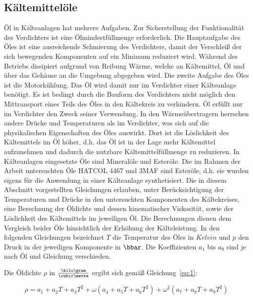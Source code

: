 \subsection{Kältemittelöle}
\label{subsec:Kältemittelöle}

Öl in Kälteanlagen hat mehrere Aufgaben.
Zur Sicherstellung der Funktionalität des Verdichters ist eine Ölmindestfüllmenge erforderlich. Die Hauptaufgabe des Öles ist eine ausreichende Schmierung des Verdichters, damit der Verschleiß der sich bewegenden Komponenten auf ein Minimum reduziert wird.  Während des Betriebs dissipiert aufgrund von Reibung Wärme, welche an Kältemittel, Öl und über das Gehäuse an die Umgebung abgegeben wird. \newline
Die zweite Aufgabe des Öles ist die Motorkühlung. Das Öl wird damit nur im Verdichter einer Kälteanlage benötigt. Es ist bedingt durch die Bauform des Verdichters nicht möglich den Mittransport eines Teils des Öles in den Kältekreis zu verhindern. Öl erfüllt nur im Verdichter den Zweck seiner Verwendung. In den Wärmeübertragern herrschen andere Drücke und Temperaturen als im Verdichter, was sich auf die physikalischen Eigenschaften des Öles auswirkt. Dort ist die Löslichkeit des Kältemittels im Öl höher, d.h. das Öl ist in der Lage mehr Kältemittel aufzunehmen und dadurch die nutzbare Kältemittelfüllmenge zu reduzieren. \newline
In Kälteanlagen eingesetzte Öle sind Mineralöle und Esteröle. Die im Rahmen der Arbeit untersuchten Öle HATCOL 4467 und 3MAF sind Esteröle, d.h. sie wurden eigens für die Anwendung in einer Kälteanlage synthetisiert\cite{ChemturaCorporation.2017}\cite{LubrizolCorporation.2015}. 
Die in diesem Abschnitt vorgestellten Gleichungen erlauben, unter Berücksichtigung der  Temperaturen und Drücke in den untersuchten Komponenten des Kältekreises, eine Berechnung der Öldichte und dessen kinematischer Viskosität, sowie der Löslichkeit des Kältemittels im jeweiligen Öl. Die Berechnungen dienen dem Vergleich beider Öle hinsichtlich der  Erhöhung der Kälteleistung. In den folgenden Gleichungen bezeichnet $T$ die Temperatur des Öles in $Kelvin$ und $p$ den Druck in der jeweiligen Komponente in $\bbar$. Die Koeffizienten $a_1$ bis $a_9$ sind je nach Öl und Gleichung verschieden.

Die Öldichte $\rho$ in $\frac{\kilo\gram}{\cubic\metre}$ ergibt sich gemäß Gleichung~\ref{eq:1}: 

\begin{equation}
\label{eq:1}
\rho = a_{1} + a_{2}T + a_{3}T^2 + \omega(a_{4}+ a_{5}T + a_{6}T^2) + \omega^2(a_{7}+ a_{8}T + a_{9}T^2)
\end{equation}

